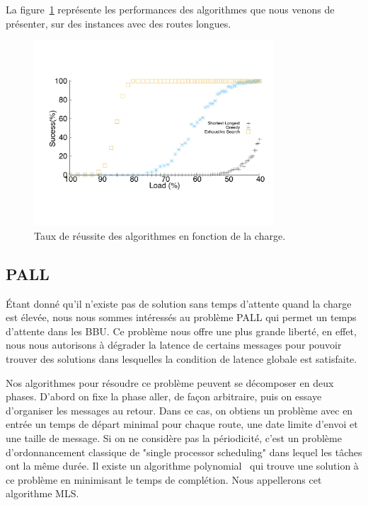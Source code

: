 \documentclass{article}
\begin{document}
 La figure~\ref{fig:long} représente les performances des algorithmes que nous venons de présenter, sur des instances avec des routes longues.
\begin{figure}[h]

       \begin{center}
      \includegraphics[width=0.8\textwidth]{echec_longues.pdf}
      \end{center}
       
      \caption{Taux de réussite des algorithmes en fonction de la charge.}\label{fig:long}
     \end{figure}
     
\subsection{PALL}
Étant donné qu'il n'existe pas de solution sans temps d'attente quand la charge est élevée, nous nous sommes intéressés au problème PALL qui permet un temps d'attente dans les BBU. Ce problème nous offre une plus grande liberté, en effet, nous nous autorisons à dégrader la latence de certains messages pour pouvoir trouver des solutions dans lesquelles la condition de latence globale est satisfaite.

Nos algorithmes pour résoudre ce problème peuvent se décomposer en deux phases. D'abord on fixe la phase aller, de façon arbitraire, puis on essaye d'organiser les messages au retour. Dans ce cas, on obtiens un problème avec en entrée un temps de départ minimal pour chaque route, une date limite d'envoi et une taille de message. Si on ne considère pas la périodicité, c'est un problème d'ordonnancement classique de "single processor scheduling" dans lequel les tâches ont la même durée. Il existe un algorithme polynomial~\cite{simons1978fast} qui trouve une solution à ce problème en minimisant le temps de complétion. Nous appellerons cet algorithme MLS.
\end{document}
